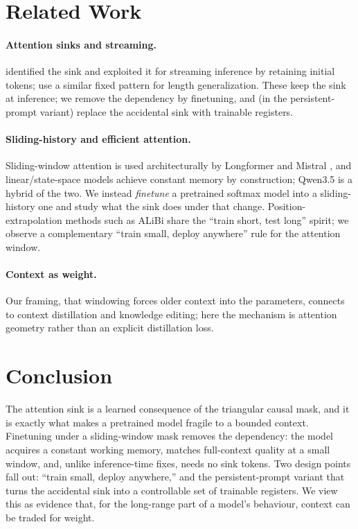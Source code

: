 \documentclass[letterpaper]{article} %
\begin{document}
\section{Related Work}
\paragraph{Attention sinks and streaming.} \citet{xiao2024streamingllm} identified the sink and exploited it for streaming inference by retaining initial tokens; \citet{han2024lminfinite} use a similar fixed pattern for length generalization. These keep the sink at inference; we remove the dependency by finetuning, and (in the persistent-prompt variant) replace the accidental sink with trainable registers.
\paragraph{Sliding-history and efficient attention.} Sliding-window attention is used architecturally by Longformer \citep{beltagy2020longformer} and Mistral \citep{jiang2023mistral}, and linear/state-space models \citep{gu2024mamba,gu2025gateddeltanet} achieve constant memory by construction; Qwen3.5 is a hybrid of the two. We instead \emph{finetune} a pretrained softmax model into a sliding-history one and study what the sink does under that change. Position-extrapolation methods such as ALiBi \citep{press2022alibi} share the ``train short, test long'' spirit; we observe a complementary ``train small, deploy anywhere'' rule for the attention window.
\paragraph{Context as weight.} Our framing, that windowing forces older context into the parameters, connects to context distillation and knowledge editing; here the mechanism is attention geometry rather than an explicit distillation loss.

\section{Conclusion}
The attention sink is a learned consequence of the triangular causal mask, and it is exactly what makes a pretrained model fragile to a bounded context. Finetuning under a sliding-window mask removes the dependency: the model acquires a constant working memory, matches full-context quality at a small window, and, unlike inference-time fixes, needs no sink tokens. Two design points fall out: ``train small, deploy anywhere,'' and the persistent-prompt variant that turns the accidental sink into a controllable set of trainable registers. We view this as evidence that, for the long-range part of a model's behaviour, context can be traded for weight.


\end{document}
